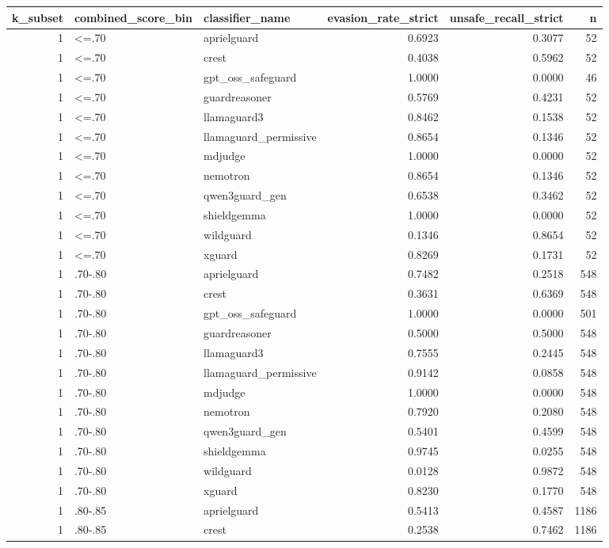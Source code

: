 \begin{tabular}{rllrrr}
\toprule
k\_subset & combined\_score\_bin & classifier\_name & evasion\_rate\_strict & unsafe\_recall\_strict & n \\
\midrule
1 & <=.70 & aprielguard & 0.6923 & 0.3077 & 52 \\
1 & <=.70 & crest & 0.4038 & 0.5962 & 52 \\
1 & <=.70 & gpt\_oss\_safeguard & 1.0000 & 0.0000 & 46 \\
1 & <=.70 & guardreasoner & 0.5769 & 0.4231 & 52 \\
1 & <=.70 & llamaguard3 & 0.8462 & 0.1538 & 52 \\
1 & <=.70 & llamaguard\_permissive & 0.8654 & 0.1346 & 52 \\
1 & <=.70 & mdjudge & 1.0000 & 0.0000 & 52 \\
1 & <=.70 & nemotron & 0.8654 & 0.1346 & 52 \\
1 & <=.70 & qwen3guard\_gen & 0.6538 & 0.3462 & 52 \\
1 & <=.70 & shieldgemma & 1.0000 & 0.0000 & 52 \\
1 & <=.70 & wildguard & 0.1346 & 0.8654 & 52 \\
1 & <=.70 & xguard & 0.8269 & 0.1731 & 52 \\
1 & .70-.80 & aprielguard & 0.7482 & 0.2518 & 548 \\
1 & .70-.80 & crest & 0.3631 & 0.6369 & 548 \\
1 & .70-.80 & gpt\_oss\_safeguard & 1.0000 & 0.0000 & 501 \\
1 & .70-.80 & guardreasoner & 0.5000 & 0.5000 & 548 \\
1 & .70-.80 & llamaguard3 & 0.7555 & 0.2445 & 548 \\
1 & .70-.80 & llamaguard\_permissive & 0.9142 & 0.0858 & 548 \\
1 & .70-.80 & mdjudge & 1.0000 & 0.0000 & 548 \\
1 & .70-.80 & nemotron & 0.7920 & 0.2080 & 548 \\
1 & .70-.80 & qwen3guard\_gen & 0.5401 & 0.4599 & 548 \\
1 & .70-.80 & shieldgemma & 0.9745 & 0.0255 & 548 \\
1 & .70-.80 & wildguard & 0.0128 & 0.9872 & 548 \\
1 & .70-.80 & xguard & 0.8230 & 0.1770 & 548 \\
1 & .80-.85 & aprielguard & 0.5413 & 0.4587 & 1186 \\
1 & .80-.85 & crest & 0.2538 & 0.7462 & 1186 \\

\end{tabular}
